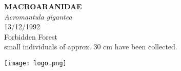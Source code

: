 \documentclass[
  landscape]{article}
\begin{document}
\begin{mdframed}[linecolor=mycolortext, linewidth=2pt, backgroundcolor=mycolor]

  \bigskip
  \begin{flushright}
  \begin{minipage}[t][-50ex][t]{16em}  
  \end{minipage}
  \end{flushright}
  \bigskip
  \begin{adjustwidth}{1cm}{1cm}
  {\fontsize{50pt}{0pt}\selectfont\bf\textcolor{mycolortext}{ MACROARANIDAE }} \\
  \linebreak
  \linebreak
  {\fontsize{40pt}{100pt}\selectfont\textcolor{mycolortext}{\emph{ Acromantula gigantea }}} \\
  \vfill
  {\fontsize{30pt}{100pt}\selectfont\textcolor{mycolortext}{ 13/12/1992 }} \\
  \vfill
  {\fontsize{30pt}{100pt}\selectfont\textcolor{mycolortext}{ Forbidden Forest }} \\
  \vfill
  {\fontsize{30pt}{50pt}\selectfont\textcolor{mycolortext}{ small individuals of approx. 30 cm have been collected. }} \\
  \end{adjustwidth}
  \begin{center}
  \texttt{[image: logo.png]}
  \end{center}
  \end{mdframed}
  \pagebreak

\end{document}
